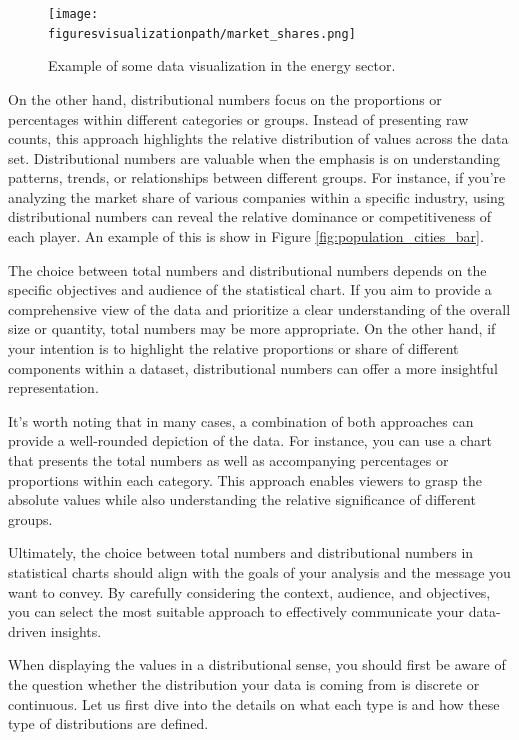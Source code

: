 \documentclass[10pt]{extarticle}
\newcommand{\<}{\langle}
\renewcommand{\>}{\rangle}
\newcommand{\figuresvisualizationpath}{D:/projecten/syntra/git-repos/data-science-syntra-ab/04 data visualizatie/figures}
\theoremstyle{mystyle}{\newtheorem*{remark}{Remark}}
\theoremstyle{mystyle}{\newtheorem*{remarks}{Remarks}}
\theoremstyle{mystyle}{\newtheorem*{example}{Example}}
\theoremstyle{mystyle}{\newtheorem*{examples}{Examples}}
\theoremstyle{definition}{\newtheorem*{exercise}{Exercise}}
\theoremstyle{warn}
\begin{document}
\begin{figure}
\center
\texttt{[image: \\figuresvisualizationpath/market\_shares.png]}  
\caption{Example of some data visualization in the energy sector.}\label{fig:datavis_market_shares}
\end{figure}

On the other hand, distributional numbers focus on the proportions or percentages within different categories or groups. Instead of presenting raw counts, this approach highlights the relative distribution of values across the data set. Distributional numbers are valuable when the emphasis is on understanding patterns, trends, or relationships between different groups. For instance, if you're analyzing the market share of various companies within a specific industry, using distributional numbers can reveal the relative dominance or competitiveness of each player. An example of this is show in Figure \ref{fig:population_cities_bar}.

The choice between total numbers and distributional numbers depends on the specific objectives and audience of the statistical chart. If you aim to provide a comprehensive view of the data and prioritize a clear understanding of the overall size or quantity, total numbers may be more appropriate. On the other hand, if your intention is to highlight the relative proportions or share of different components within a dataset, distributional numbers can offer a more insightful representation.

It's worth noting that in many cases, a combination of both approaches can provide a well-rounded depiction of the data. For instance, you can use a chart that presents the total numbers as well as accompanying percentages or proportions within each category. This approach enables viewers to grasp the absolute values while also understanding the relative significance of different groups.

Ultimately, the choice between total numbers and distributional numbers in statistical charts should align with the goals of your analysis and the message you want to convey. By carefully considering the context, audience, and objectives, you can select the most suitable approach to effectively communicate your data-driven insights.

When displaying the values in a distributional sense, you should first be aware of the question whether the distribution your data is coming from is discrete or continuous. Let us first dive into the details on what each type is and how these type of distributions are defined.
\end{document}
